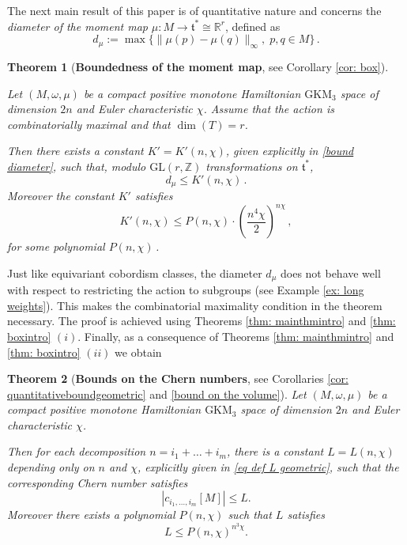 \documentclass[12pt,a4paper]{amsart}
\newcommand{\GL}{\mathrm{GL}}
\newcommand{\mft}{\mathfrak{t}}
\newcommand{\RR}{\mathbb{R}}
\newcommand{\ZZ}{\mathbb{Z}}
\theoremstyle{plain}
\newtheorem{maintheorem}{Theorem}
\theoremstyle{definition}
\begin{document}
\vspace{0.3cm}

The next main result of this paper is of quantitative nature and concerns the \emph{diameter of the moment map} $\mu\colon M \to \mathfrak{t}^*\cong \RR^r$, defined as 
\begin{equation}\label{diameter}
d_\mu:=\max\{\|\mu(p)-\mu(q)\|_\infty, \;p,q\in M\}\,.
\end{equation}
\begin{maintheorem}[\textbf{Boundedness of the moment map}, see Corollary \ref{cor: box}]\label{thm bd intro}

Let $(M,\omega,\mu)$ be a compact positive monotone Hamiltonian $\text{GKM}_3$ space of dimension $2n$ and Euler characteristic $\chi$.
Assume that the action is combinatorially maximal and that $\dim(T)=r$.

Then there exists a constant $K'=K'(n,\chi)$, given explicitly in \eqref{bound diameter}, such that, modulo $\GL(r,\ZZ)$ transformations on $\mft^*$,
\begin{equation}\label{diameter intro}
d_\mu \leq K'(n,\chi)\,.
\end{equation}
Moreover the constant $K'$ satisfies 
 \[K'(n,\chi)\leq P(n,\chi)\cdot\left(\frac{ n^4\chi}{2}\right)^{n\chi}\,,\]
 for some polynomial $P(n,\chi)$\,.
\end{maintheorem}

 Just like equivariant cobordism classes, the diameter $d_\mu$ does not behave well with respect to restricting the action to subgroups (see Example \ref{ex: long weights}). This makes the combinatorial maximality
 condition in the theorem necessary. 
The proof is achieved using Theorems \ref{thm: mainthmintro} and \ref{thm: boxintro} $(i)$.
Finally, as a consequence of Theorems \ref{thm: mainthmintro} and \ref{thm: boxintro} $(ii)$ we obtain
\begin{maintheorem}[\textbf{Bounds on the Chern numbers}, see Corollaries \ref{cor: quantitativeboundgeometric} and \ref{bound on the volume}]
Let $(M,\omega,\mu)$ be a compact positive monotone Hamiltonian $\text{GKM}_3$ space of dimension $2n$ and Euler characteristic $\chi$.

Then for each decomposition $n=i_1+\ldots+i_m$, there is a constant $L=L(n,\chi)$ depending only on $n$ and $\chi$, explicitly given in \eqref{eq def L geometric}, such that the corresponding Chern number satisfies
\[|c_{i_1,\ldots,i_m}[M]|\leq L.\]
Moreover there exists a polynomial $P(n,\chi)$ such that $L$ satisfies
\[L \leq P(n,\chi)^{n^3\chi}.\]

\end{maintheorem}
\end{document}
